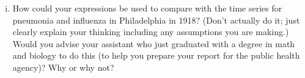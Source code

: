 \documentclass[12pt]{article}
\begin{document}
\begin{enumerate}[(a)]
\begin{enumerate}[(i)]
{\color{blue}
\begin{proof}[Solution]
{\color{magenta}

\begin{align}
		R_p &= 1- \frac{2}{\R_0} - (I_0+S_0) - \frac{1}{\R_0} \ln{\R_0 S_0}  \\
		t_p &= \frac{\sqrt{2}}{\sqrt{S_0\R_0^2(S_0-2)+2S_0\R_0 -1}} \Bigl ( \tan ^{-1} \left ( \frac{S_0\R_0^2 \left ( 1- \frac{2}{\R_0} - (I_0+S_0) - \frac{1}{\R_0} \ln{\R_0 S_0}  \right ) - S_0\R_0 +1}{\sqrt{S_0\R_0^2(S_0-2)+2S_0\R_0 -1}} \right )\\
		&-\tan ^{-1} \left ( \frac{1 - S_0\R_0 }{\sqrt{S_0\R_0^2(S_0-2)+2S_0\R_0 -1}} \right )  \Bigl ) 
	\end{align}

}
\end{proof}
}

\item How could your expressions be used to compare with the time series for pneumonia and influenza in Philadelphia in 1918?  (Don't actually do it; just clearly explain your thinking including any assumptions you are making.)  Would you advise your assistant who just graduated with a degree in math and biology to do this (to help you prepare your report for the public health agency)?  Why or why not?


\end{enumerate}
\end{enumerate}
\end{document}
